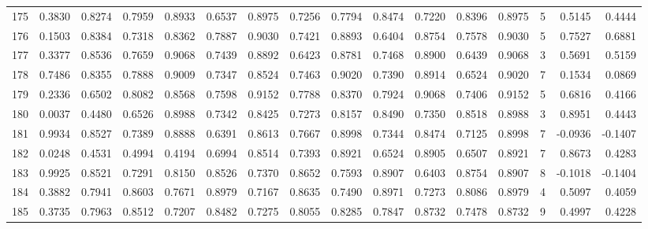 \begin{tabular}{lrrrrrrrrrrrrrrr}
175 &      0.3830 &  0.8274 &  0.7959 &  0.8933 &  0.6537 &  0.8975 &  0.7256 &  0.7794 &  0.8474 &  0.7220 &   0.8396 &     0.8975 &      5 &                    0.5145 &                     0.4444 \\
176 &      0.1503 &  0.8384 &  0.7318 &  0.8362 &  0.7887 &  0.9030 &  0.7421 &  0.8893 &  0.6404 &  0.8754 &   0.7578 &     0.9030 &      5 &                    0.7527 &                     0.6881 \\
177 &      0.3377 &  0.8536 &  0.7659 &  0.9068 &  0.7439 &  0.8892 &  0.6423 &  0.8781 &  0.7468 &  0.8900 &   0.6439 &     0.9068 &      3 &                    0.5691 &                     0.5159 \\
178 &      0.7486 &  0.8355 &  0.7888 &  0.9009 &  0.7347 &  0.8524 &  0.7463 &  0.9020 &  0.7390 &  0.8914 &   0.6524 &     0.9020 &      7 &                    0.1534 &                     0.0869 \\
179 &      0.2336 &  0.6502 &  0.8082 &  0.8568 &  0.7598 &  0.9152 &  0.7788 &  0.8370 &  0.7924 &  0.9068 &   0.7406 &     0.9152 &      5 &                    0.6816 &                     0.4166 \\
180 &      0.0037 &  0.4480 &  0.6526 &  0.8988 &  0.7342 &  0.8425 &  0.7273 &  0.8157 &  0.8490 &  0.7350 &   0.8518 &     0.8988 &      3 &                    0.8951 &                     0.4443 \\
181 &      0.9934 &  0.8527 &  0.7389 &  0.8888 &  0.6391 &  0.8613 &  0.7667 &  0.8998 &  0.7344 &  0.8474 &   0.7125 &     0.8998 &      7 &                   -0.0936 &                    -0.1407 \\
182 &      0.0248 &  0.4531 &  0.4994 &  0.4194 &  0.6994 &  0.8514 &  0.7393 &  0.8921 &  0.6524 &  0.8905 &   0.6507 &     0.8921 &      7 &                    0.8673 &                     0.4283 \\
183 &      0.9925 &  0.8521 &  0.7291 &  0.8150 &  0.8526 &  0.7370 &  0.8652 &  0.7593 &  0.8907 &  0.6403 &   0.8754 &     0.8907 &      8 &                   -0.1018 &                    -0.1404 \\
184 &      0.3882 &  0.7941 &  0.8603 &  0.7671 &  0.8979 &  0.7167 &  0.8635 &  0.7490 &  0.8971 &  0.7273 &   0.8086 &     0.8979 &      4 &                    0.5097 &                     0.4059 \\
185 &      0.3735 &  0.7963 &  0.8512 &  0.7207 &  0.8482 &  0.7275 &  0.8055 &  0.8285 &  0.7847 &  0.8732 &   0.7478 &     0.8732 &      9 &                    0.4997 &                     0.4228 \\

\end{tabular}
